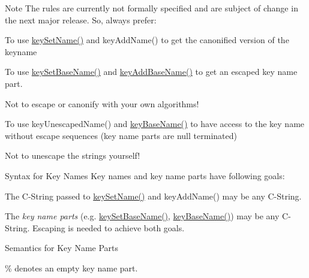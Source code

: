 \begin{DoxyNote}{Note}
The rules are currently not formally specified and are subject of change in the next major release. So, always prefer\-:
\begin{DoxyItemize}
\item To use \hyperlink{group__keyname_ga7699091610e7f3f43d2949514a4b35d9}{key\-Set\-Name()} and key\-Add\-Name() to get the canonified version of the keyname
\item To use \hyperlink{group__keyname_ga6e804bd453f98c28b0ff51430d1df407}{key\-Set\-Base\-Name()} and \hyperlink{group__keyname_gaa942091fc4bd5c2699e49ddc50829524}{key\-Add\-Base\-Name()} to get an escaped key name part.
\item Not to escape or canonify with your own algorithms!
\item To use key\-Unescaped\-Name() and \hyperlink{group__keyname_gaaff35e7ca8af5560c47e662ceb9465f5}{key\-Base\-Name()} to have access to the key name without escape sequences (key name parts are null terminated)
\item Not to unescape the strings yourself!
\end{DoxyItemize}
\end{DoxyNote}
\begin{DoxyParagraph}{Syntax for Key Names}
Key names and key name parts have following goals\-:
\begin{DoxyItemize}
\item The C-\/\-String passed to \hyperlink{group__keyname_ga7699091610e7f3f43d2949514a4b35d9}{key\-Set\-Name()} and key\-Add\-Name() may be any C-\/\-String.
\item The {\itshape key name parts} (e.\-g. \hyperlink{group__keyname_ga6e804bd453f98c28b0ff51430d1df407}{key\-Set\-Base\-Name()}, \hyperlink{group__keyname_gaaff35e7ca8af5560c47e662ceb9465f5}{key\-Base\-Name()}) may be any C-\/\-String. Escaping is needed to achieve both goals.
\end{DoxyItemize}
\end{DoxyParagraph}
\begin{DoxyParagraph}{Semantics for Key Name Parts}

\begin{DoxyItemize}
\item \% denotes an empty key name part.
\end{DoxyItemize}
\end{DoxyParagraph}
